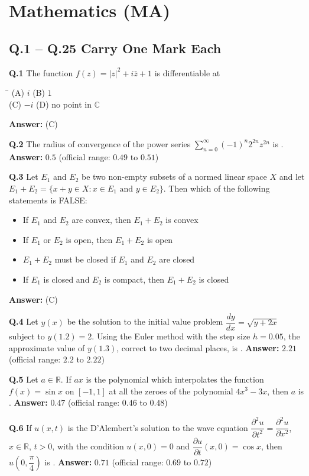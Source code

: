 \documentclass[11pt,a4paper]{article}
\newcommand{\optsfourA}[4]{%
  \begin{tabbing}
    \hspace{0.48\linewidth}\=\kill
    (A) #1 \> (B) #2 \\[2pt]
    (C) #3 \> (D) #4
  \end{tabbing}%
}
\newcommand{\optslistA}[4]{%
  \begin{itemize}
    \setlength{\itemsep}{2pt}\setlength{\parskip}{0pt}
    \item[(A)] #1
    \item[(B)] #2
    \item[(C)] #3
    \item[(D)] #4
  \end{itemize}%
}
\newcommand{\ans}[1]{\textbf{Answer:} #1\par\medskip}
\begin{document}
\section*{Mathematics (MA)}

\subsection*{Q.1 -- Q.25 Carry One Mark Each}

\textbf{Q.1} The function $f(z) = |z|^2 + i\bar{z} + 1$ is differentiable at
\optsfourA{$i$}{$1$}{$-i$}{no point in $\mathbb{C}$}
\ans{(C)}

\textbf{Q.2} The radius of convergence of the power series $\displaystyle\sum_{n=0}^{\infty} (-1)^n 2^{2n} z^{2n}$ is \underline{\hspace{2cm}}.
\ans{$0.5$ (official range: $0.49$ to $0.51$)}

\textbf{Q.3} Let $E_1$ and $E_2$ be two non-empty subsets of a normed linear space $X$ and let $E_1 + E_2 = \{x + y \in X : x \in E_1 \text{ and } y \in E_2\}$. Then which of the following statements is FALSE:
\optslistA{If $E_1$ and $E_2$ are convex, then $E_1 + E_2$ is convex}{If $E_1$ or $E_2$ is open, then $E_1 + E_2$ is open}{$E_1 + E_2$ must be closed if $E_1$ and $E_2$ are closed}{If $E_1$ is closed and $E_2$ is compact, then $E_1 + E_2$ is closed}
\ans{(C)}

\textbf{Q.4} Let $y(x)$ be the solution to the initial value problem $\dfrac{dy}{dx} = \sqrt{y + 2x}$ subject to $y(1.2) = 2$. Using the Euler method with the step size $h = 0.05$, the approximate value of $y(1.3)$, correct to two decimal places, is \underline{\hspace{2cm}}.
\ans{$2.21$ (official range: $2.2$ to $2.22$)}

\textbf{Q.5} Let $a \in \mathbb{R}$. If $ax$ is the polynomial which interpolates the function $f(x) = \sin x$ on $[-1, 1]$ at all the zeroes of the polynomial $4x^3 - 3x$, then $a$ is \underline{\hspace{2cm}}.
\ans{$0.47$ (official range: $0.46$ to $0.48$)}

\textbf{Q.6} If $u(x, t)$ is the D'Alembert's solution to the wave equation $\dfrac{\partial^2 u}{\partial t^2} = \dfrac{\partial^2 u}{\partial x^2}$, $x \in \mathbb{R}$, $t > 0$, with the condition $u(x, 0) = 0$ and $\dfrac{\partial u}{\partial t}(x, 0) = \cos x$, then $u\!\left(0, \dfrac{\pi}{4}\right)$ is \underline{\hspace{2cm}}.
\ans{$0.71$ (official range: $0.69$ to $0.72$)}
\end{document}
